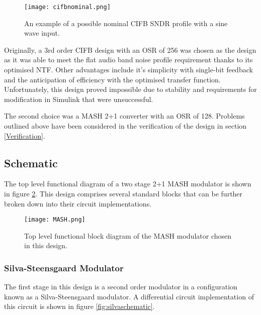 \begin{figure}
    \begin{center}
    \texttt{[image: cifbnominal.png]}
    \label{fig:cifbnominal}
    \caption{An example of a possible nominal CIFB SNDR profile with a sine wave input.}
    \end{center}
\end{figure}


Originally, a 3rd order CIFB design with an OSR of 256 was chosen as the design as it was able to meet the flat audio band noise profile requirement thanks to its optimised NTF.
Other advantages include it's simplicity with single-bit feedback and the anticipation of efficiency with the optimised transfer function.
Unfortunately, this design proved impossible due to stability and requirements for modification in Simulink that were unsuccessful.

The second choice was a MASH 2+1 converter with an OSR of 128.
Problems outlined above have been considered in the verification of the design in section \ref{Verification}.

    \subsection{Schematic}
    \label{Design:schematic}
    The top level functional diagram of a two stage 2+1 MASH modulator is shown in figure \ref{fig:MASH}.
    This design comprises several standard blocks that can be further broken down into their circuit implementations.

    \begin{figure}
        \begin{center}
        \texttt{[image: MASH.png]}
        \label{fig:MASH}
        \caption{Top level functional block diagram of the MASH modulator chosen in this design.}
        \end{center}
    \end{figure}

        \subsubsection{Silva-Steensgaard Modulator}
        The first stage in this design is a second order modulator in a configuration known as a Silva-Steensgaard modulator.
        A differential circuit implementation of this circuit is shown in figure \ref{fig:silvaschematic}.


